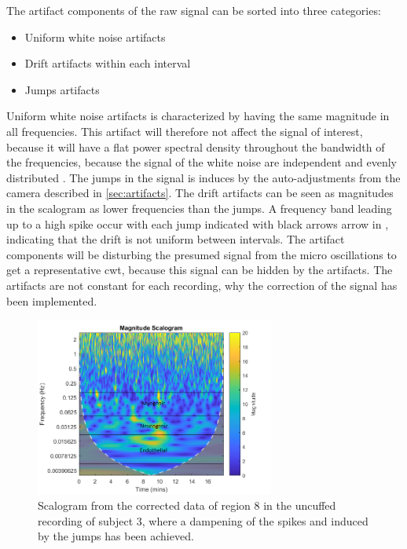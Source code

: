 The artifact components of the raw signal can be sorted into three categories: 
\begin{itemize}
	\item Uniform white noise artifacts
    \item Drift artifacts within each interval
	\item Jumps artifacts
\end{itemize}

Uniform white noise artifacts is characterized by having the same magnitude in all frequencies. This artifact will therefore not affect the signal of interest, because it will have a flat power spectral density throughout the bandwidth of the frequencies, because the signal of the white noise are independent and evenly distributed \cite{hida2014}. 
The jumps in the signal is induces by the auto-adjustments from the camera described in \ref{sec:artifacts}. The drift artifacts can be seen as magnitudes in the scalogram as lower frequencies than the jumps. A frequency band leading up to a high spike occur with each jump indicated with black arrows arrow in , indicating that the drift is not uniform between intervals.
The artifact components will be disturbing the presumed signal from the micro oscillations to get a representative cwt, because this signal can be hidden by the artifacts. The artifacts are not constant for each recording, why the correction of the signal has been implemented.

\begin{figure}[H]
	\includegraphics[width=0.7\textwidth]{figures/uncuffed_sub3_roi8_corr}
	\caption{Scalogram from the corrected data of region 8 in the uncuffed recording of subject 3, where a dampening of the spikes and  induced by the jumps has been achieved.}
	\label{fig:scalogram_corr}
\end{figure} 

